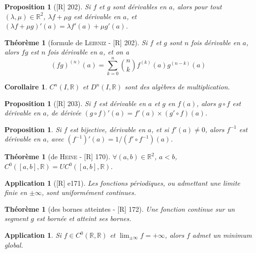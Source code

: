 \documentclass[10pt, a4paper, parskip=full, twoside, twocolumn]{report}
\newtheorem{theorem}[definition]{Théorème}
\newtheorem{proposition}[definition]{Proposition}
\newtheorem{corollary}[definition]{Corollaire}
\newtheorem{application}[definition]{Application}
\newcommand{\IR}{\mathbb{R}}
\begin{document}
\begin{proposition}[\textnormal{[R] 202}]
	Si $f$ et $g$ sont dérivables en $a$, alors pour tout $(\lambda,\mu)\in \IR^2$, $\lambda f + \mu g$ est dérivable en $a$, et $(\lambda f + \mu g)'(a) = \lambda f'(a) + \mu g'(a)$.
\end{proposition}

\begin{theorem}[formule de \textsc{Leibniz} - \textnormal{[R] 202}]
	Si $f$ et $g$ sont $n$ fois dérivable en $a$, alors $fg$ est $n$ fois dérivable en $a$, et on a 
	$$(fg)^{(n)}(a) = \sum_{k=0}^{n} {n\choose k} f^{(k)}(a)g^{(n-k)}(a)$$
\end{theorem}

\begin{corollary}
	$C^n(I,\IR)$ et $D^n(I,\IR)$ sont des algèbres de multiplication.
\end{corollary}

\begin{proposition}[\textnormal{[R] 203}]
	Si $f$ est dérivable en $a$ et $g$ en $f(a)$, alors $g\circ f$ est dérivable en $a$, de dérivée $(g\circ f)'(a) = f'(a)\times (g'\circ f)(a)$.
\end{proposition}

\begin{proposition}
	Si $f$ est bijective, dérivable en $a$, et si $f'(a)\neq 0$, alors $f^{-1}$ est dérivable en $a$, avec $(f^{-1})'(a) = 1 / (f'\circ f^{-1})(a)$.
\end{proposition}

\begin{theorem}[de \textsc{Heine} - \textnormal{[R] 170}]
	$\forall (a,b)\in\IR^2$, $a<b$, $C^0([a,b], \IR) = UC^0([a,b], \IR)$.
\end{theorem}

\begin{application}[\textnormal{[R] e171}]
	Les fonctions périodiques, ou admettant une limite finie en $\pm\infty$, sont uniformément continues.
\end{application}

\begin{theorem}[des bornes atteintes - \textnormal{[R] 172}]
	Une fonction continue sur un segment $g$ est bornée et atteint ses bornes.
\end{theorem}

\begin{application}
	Si $f\in C^0(\IR,\IR)$ et $\displaystyle{\lim_{\pm\infty} f = +\infty}$, alors $f$ admet un minimum global.
\end{application}
\end{document}
